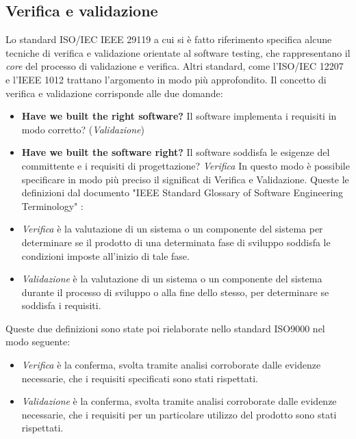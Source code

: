 \documentclass[../main.tex]{subfiles}
\begin{document}
\subsection{Verifica e validazione}

Lo standard ISO/IEC IEEE 29119 \cite{iso29119} a cui si è fatto riferimento specifica alcune tecniche di verifica e validazione orientate al software testing, che rappresentano il \textit{core} del processo di validazione e verifica. Altri standard, come l'ISO/IEC 12207 \cite{iso12207} e l'IEEE 1012 \cite{ieee1012} trattano l'argomento in modo più approfondito.
Il concetto di verifica e validazione corrisponde alle due domande:
\begin{itemize}
\item \textbf{Have we built the right software?} Il software implementa i requisiti in modo corretto? (\textit{Validazione})
\item \textbf{Have we built the software right?} Il software soddisfa le esigenze del committente e i requisiti di progettazione? \textit{Verifica}
In questo modo è possibile specificare in modo più preciso il significat di Verifica e Validazione.
Queste le definizioni dal documento "IEEE Standard Glossary of Software Engineering Terminology" \cite{NistGlossary}:
\end{itemize}
\begin{itemize}
\item \textit{Verifica} è la valutazione di un sistema o un componente del sistema per determinare se il prodotto di una determinata fase di sviluppo soddisfa le condizioni imposte all'inizio di tale fase.
\item \textit{Validazione} è la valutazione di un sistema o un componente del sistema durante il processo di sviluppo o alla fine dello stesso, per determinare se soddisfa i requisiti.
\end{itemize}
Queste due definizioni sono state poi rielaborate nello standard ISO9000 \cite{iso9000} nel modo seguente:
\begin{itemize}
\item \textit{Verifica} è la conferma, svolta tramite analisi corroborate dalle evidenze necessarie, che i requisiti specificati sono stati rispettati.
\item \textit{Validazione} è la conferma, svolta tramite analisi corroborate dalle evidenze necessarie, che i requisiti per un particolare utilizzo del prodotto sono stati rispettati.
\end{itemize}
\end{document}
